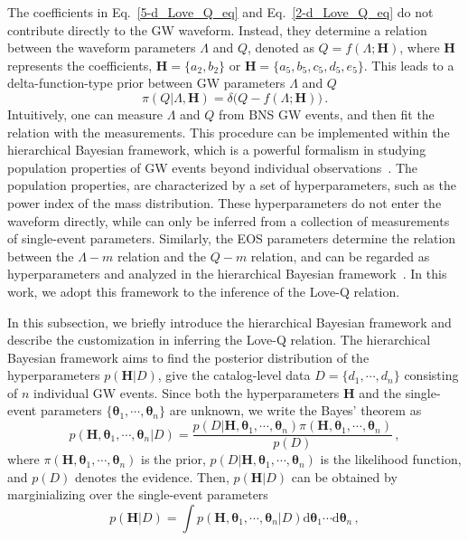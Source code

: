 \documentclass[a4paper,11pt]{article}
\begin{document}
The coefficients in Eq.~\eqref{5-d_Love_Q_eq} and Eq.~\eqref{2-d_Love_Q_eq} 
do not contribute directly to the GW waveform. Instead, they 
determine a relation between the waveform parameters
$\Lambda$ and $Q$, denoted as $Q=f(\Lambda;\bm{H})$, where $\bm{H}$ represents
the coefficients, $\bm{H} = \{a_2, b_2\}$ or $\bm{H} = \{a_5, b_5, c_5, d_5,
e_5\}$.
This leads to a delta-function-type prior between GW parameters $\Lambda$ and $Q$
\begin{equation}
\label{delta function prior}
\pi(Q|\Lambda,\bm{H}) = \delta\big(Q-f(\Lambda;\bm{H})\big)\,.
\end{equation}
Intuitively, one can measure $\Lambda$ and $Q$ from BNS GW events, and then fit
the relation with the measurements. This procedure can be implemented within the
hierarchical Bayesian framework, which is a powerful formalism in studying population
properties of GW events beyond individual observations~\cite{Thrane_2019}. The
population properties, 
are characterized by a set of hyperparameters, such as the power index of the
mass distribution. These hyperparameters do not enter the waveform directly,
while can only be inferred from a collection of measurements of single-event
parameters. Similarly, the EOS parameters determine the relation between the
$\Lambda-m$ relation and the $Q-m$ relation, and can be regarded as
hyperparameters and analyzed in the hierarchical Bayesian
framework~\cite{Mandel:2009nx,Mandel:2009pc,Adams:2012qw,Lackey:2014fwa,Mandel:2018mve,Golomb:2021tll,KAGRA:2021duu,Wang:2024xon}. In this work,
we adopt this framework to the inference of the Love-Q relation.


In this subsection, we briefly introduce the hierarchical Bayesian framework and
describe the customization in inferring the Love-Q relation.
The hierarchical Bayesian framework aims to
find the posterior distribution of the hyperparameters $p(\bm{H}|D)$, give the
catalog-level data $D=\{d_1,\cdots,d_n\}$ consisting of $n$ individual GW events.
Since both the hyperparameters $\bm{H}$ and the single-event parameters
$\{\bm{\theta}_1,\cdots,\bm{\theta}_n\}$ are unknown, we write the Bayes'
theorem as 
\begin{equation}
\label{bayes2}
p(\bm{H},\bm{\theta}_1,\cdots,\bm{\theta}_n|D)=\frac{p(D|\bm{H},\bm{\theta}_1,\cdots,\bm{\theta}_n)\pi(\bm{H},\bm{\theta}_1,\cdots,\bm{\theta}_n)}{p(D)}\,,
\end{equation}
where $\pi(\bm{H},\bm{\theta}_1,\cdots,\bm{\theta}_n)$ is the prior, $p(D|\bm{H},\bm{\theta}_1,\cdots,\bm{\theta}_n)$ 
is the likelihood function, and $p(D)$ denotes the evidence. Then, $p(\bm{H}|D)$
can be obtained by 
marginializing over the single-event parameters
\begin{equation}
\label{bayes1}
p(\bm{H}|D) = \int p(\bm{H},\bm{\theta}_1,\cdots,\bm{\theta}_n|D) \text{d}\bm{\theta}_1\cdots\text{d}\bm{\theta}_n\,,
\end{equation}
\end{document}
